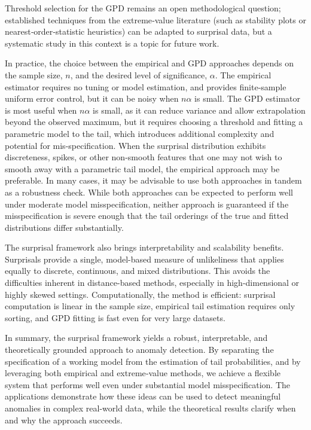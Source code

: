 \documentclass[
  12pt]{article}
\theoremstyle{plain}
\theoremstyle{plain}
\theoremstyle{definition}
\theoremstyle{plain}
\theoremstyle{remark}
\begin{document}
Threshold selection for the GPD remains an open methodological question;
established techniques from the extreme‑value literature (such as
stability plots or nearest‑order‑statistic heuristics) can be adapted to
surprisal data, but a systematic study in this context is a topic for
future work.

In practice, the choice between the empirical and GPD approaches depends
on the sample size, \(n\), and the desired level of significance,
\(\alpha\). The empirical estimator requires no tuning or model
estimation, and provides finite-sample uniform error control, but it can
be noisy when \(n\alpha\) is small. The GPD estimator is most useful
when \(n\alpha\) is small, as it can reduce variance and allow
extrapolation beyond the observed maximum, but it requires choosing a
threshold and fitting a parametric model to the tail, which introduces
additional complexity and potential for mis-specification. When the
surprisal distribution exhibits discreteness, spikes, or other
non-smooth features that one may not wish to smooth away with a
parametric tail model, the empirical approach may be preferable. In many
cases, it may be advisable to use both approaches in tandem as a
robustness check. While both approaches can be expected to perform well
under moderate model misspecification, neither approach is guaranteed if
the misspecification is severe enough that the tail orderings of the
true and fitted distributions differ substantially.

The surprisal framework also brings interpretability and scalability
benefits. Surprisals provide a single, model-based measure of
unlikeliness that applies equally to discrete, continuous, and mixed
distributions. This avoids the difficulties inherent in distance-based
methods, especially in high-dimensional or highly skewed settings.
Computationally, the method is efficient: surprisal computation is
linear in the sample size, empirical tail estimation requires only
sorting, and GPD fitting is fast even for very large datasets.

In summary, the surprisal framework yields a robust, interpretable, and
theoretically grounded approach to anomaly detection. By separating the
specification of a working model from the estimation of tail
probabilities, and by leveraging both empirical and extreme‑value
methods, we achieve a flexible system that performs well even under
substantial model misspecification. The applications demonstrate how
these ideas can be used to detect meaningful anomalies in complex
real-world data, while the theoretical results clarify when and why the
approach succeeds.
\end{document}
